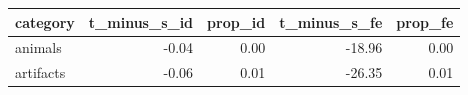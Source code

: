 \begin{table}[ht]
\centering
\begin{tabular}{lrrrr}
  \hline
category & t\_minus\_s\_id & prop\_id & t\_minus\_s\_fe & prop\_fe \\ 
  \hline
animals & -0.04 & 0.00 & -18.96 & 0.00 \\ 
  artifacts & -0.06 & 0.01 & -26.35 & 0.01 \\ 
   \hline
\end{tabular}
\end{table}
